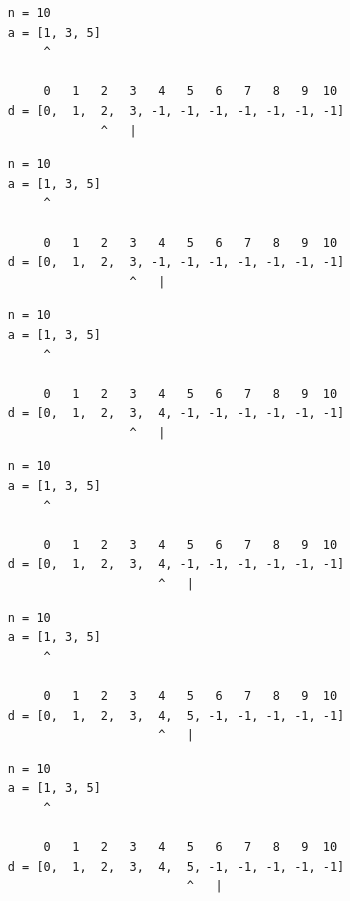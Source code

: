 \begin{frame}[fragile]
\begin{verbatim}
     n = 10
     a = [1, 3, 5]
          ^

          0   1   2   3   4   5   6   7   8   9  10
     d = [0,  1,  2,  3, -1, -1, -1, -1, -1, -1, -1]
                  ^   |
\end{verbatim}
\end{frame}
\addtocounter{framenumber}{-1}

\begin{frame}[fragile]
\begin{verbatim}
     n = 10
     a = [1, 3, 5]
          ^

          0   1   2   3   4   5   6   7   8   9  10
     d = [0,  1,  2,  3, -1, -1, -1, -1, -1, -1, -1]
                      ^   |
\end{verbatim}
\end{frame}
\addtocounter{framenumber}{-1}

\begin{frame}[fragile]
\begin{verbatim}
     n = 10
     a = [1, 3, 5]
          ^

          0   1   2   3   4   5   6   7   8   9  10
     d = [0,  1,  2,  3,  4, -1, -1, -1, -1, -1, -1]
                      ^   |
\end{verbatim}
\end{frame}
\addtocounter{framenumber}{-1}

\begin{frame}[fragile]
\begin{verbatim}
     n = 10
     a = [1, 3, 5]
          ^

          0   1   2   3   4   5   6   7   8   9  10
     d = [0,  1,  2,  3,  4, -1, -1, -1, -1, -1, -1]
                          ^   |
\end{verbatim}
\end{frame}
\addtocounter{framenumber}{-1}

\begin{frame}[fragile]
\begin{verbatim}
     n = 10
     a = [1, 3, 5]
          ^

          0   1   2   3   4   5   6   7   8   9  10
     d = [0,  1,  2,  3,  4,  5, -1, -1, -1, -1, -1]
                          ^   |
\end{verbatim}
\end{frame}
\addtocounter{framenumber}{-1}

\begin{frame}[fragile]
\begin{verbatim}
     n = 10
     a = [1, 3, 5]
          ^

          0   1   2   3   4   5   6   7   8   9  10
     d = [0,  1,  2,  3,  4,  5, -1, -1, -1, -1, -1]
                              ^   |
\end{verbatim}
\end{frame}
\addtocounter{framenumber}{-1}

